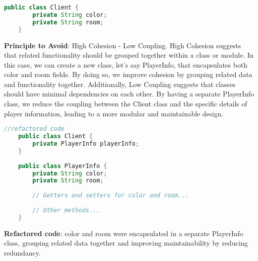 \documentclass[12pt]{article}
\numberwithin{table}{section}
\begin{document}
\begin{lstlisting}[language=Java]
	public class Client {
		private String color;
		private String room;
	}
\end{lstlisting} 

\textbf{Principle to Avoid}: High Cohesion - Low Coupling. High Cohesion suggests that related functionality should be grouped together within a class or module. In this case, we can create a new class, let's say PlayerInfo, that encapsulates both color and room fields. By doing so, we improve cohesion by grouping related data and functionality together. Additionally, Low Coupling suggests that classes should have minimal dependencies on each other. By having a separate PlayerInfo class, we reduce the coupling between the Client class and the specific details of player information, leading to a more modular and maintainable design.
\begin{lstlisting}[language=Java]
	//refactored code
	public class Client {
		private PlayerInfo playerInfo;
	}
	
	public class PlayerInfo {
		private String color;
		private String room;
		
		// Getters and setters for color and room...
		
		// Other methods...
	}
\end{lstlisting} 
\textbf{Refactored code}: color and room were encapsulated in a separate PlayerInfo class, grouping related data together and improving maintainability by reducing redundancy.
\end{document}
